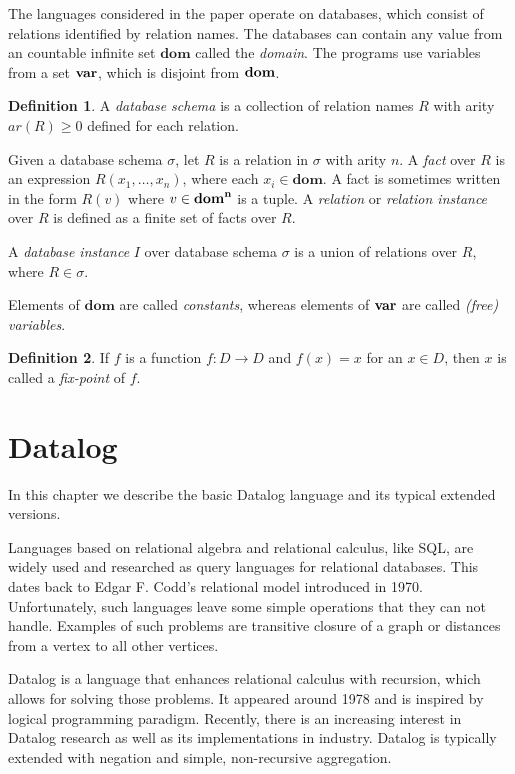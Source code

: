 \documentclass{pracamgr}
\theoremstyle{plain}
\theoremstyle{definition}
\newtheorem{defn}{Definition}[section]
\theoremstyle{remark}
\begin{document}
The languages considered in the paper operate on databases, which consist of relations identified by relation names. The databases can contain any value from an countable infinite set $\bm{dom}$ called the \emph{domain}. The programs use variables from a set $\bf{var}$, which is disjoint from $\bf{dom}$.

\begin{defn}
A \emph{database schema} is a collection of relation names $R$ with arity $ar(R) \ge 0$ defined for each relation.

Given a database schema $\sigma$, let $R$ is a relation in $\sigma$ with arity $n$. A \emph{fact} over $R$ is an expression $R(x_1 , \dots , x_n)$, where each $x_i \in \bm{dom}$. A fact is sometimes written in the form $R(v)$ where $v \in \bf{dom}^n$ is a tuple. A \emph{relation} or \emph{relation instance} over $R$ is defined as a finite set of facts over $R$.

A \emph{database instance} $I$ over database schema $\sigma$ is a union of relations over $R$, where $R \in \sigma$.

Elements of $\bm{dom}$ are called \emph{constants}, whereas elements of $\bf{var}$ are called \emph{(free) variables}.
\end{defn}

\begin{defn}
If $f$ is a function $f: D \to D$ and $f(x) = x$ for an $x \in D$, then $x$ is called a \emph{fix-point} of $f$.
\end{defn}



\chapter{Datalog}\label{r:datalog}

In this chapter we describe the basic Datalog language and its typical extended versions.

Languages based on relational algebra and relational calculus, like SQL, are widely used and researched as query languages for relational databases. This dates back to Edgar F. Codd's relational model \cite{coddrelmodel} introduced in 1970. Unfortunately, such languages leave some simple operations that they can not handle. Examples of such problems are transitive closure of a graph or distances from a vertex to all other vertices.

Datalog is a language that enhances relational calculus with recursion, which allows for solving those problems. It appeared around 1978 and is inspired by logical programming paradigm. Recently, there is an increasing interest in Datalog research as well as its implementations in industry. Datalog is typically extended with negation and simple, non-recursive aggregation.
\end{document}
